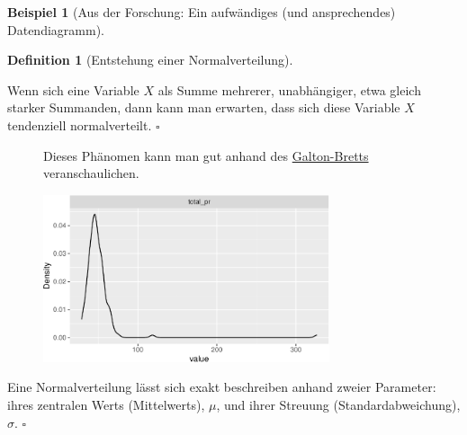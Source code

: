 \documentclass[
  a4paper,
]{scrbook}
\theoremstyle{definition}
\newtheorem{example}{Beispiel}[chapter]
\theoremstyle{definition}
\newtheorem{definition}{Definition}[chapter]
\theoremstyle{definition}
\theoremstyle{remark}
\begin{document}
\begin{example}[Aus der Forschung: Ein aufwändiges (und ansprechendes)
Datendiagramm]
\begin{definition}[Entstehung einer
Normalverteilung]\protect\hypertarget{def-normal}{}\label{def-normal}

Wenn sich eine Variable \(X\) als Summe mehrerer, unabhängiger, etwa
gleich starker Summanden, dann kann man erwarten, dass sich diese
Variable \(X\) tendenziell normalverteilt. \(\square\)

\end{definition}

\begin{figure}

\begin{minipage}{0.80\linewidth}
Dieses Phänomen kann man gut anhand des
\href{https://www.youtube.com/watch?v=3m4bxse2JEQ}{Galton-Bretts}
veranschaulichen.\end{minipage}%
%
\begin{minipage}{0.20\linewidth}

\begin{center}
\includegraphics[width=0.75\textwidth,height=\textheight]{040-verbildlichen_files/figure-pdf/unnamed-chunk-16-1.pdf}
\end{center}

\end{minipage}%

\end{figure}%

\begin{tcolorbox}[enhanced jigsaw, colbacktitle=quarto-callout-important-color!10!white, bottomrule=.15mm, left=2mm, breakable, rightrule=.15mm, coltitle=black, title=\textcolor{quarto-callout-important-color}{\faExclamation}\hspace{0.5em}{Parameter der Normalverteilung}, colback=white, leftrule=.75mm, titlerule=0mm, opacityback=0, bottomtitle=1mm, toprule=.15mm, arc=.35mm, toptitle=1mm, opacitybacktitle=0.6, colframe=quarto-callout-important-color-frame]

Eine Normalverteilung lässt sich exakt beschreiben anhand zweier
Parameter: ihres zentralen Werts (Mittelwerts), \(\mu\), und ihrer
Streuung (Standardabweichung), \(\sigma\). \(\square\)


\end{tcolorbox}
\end{example}
\end{document}
